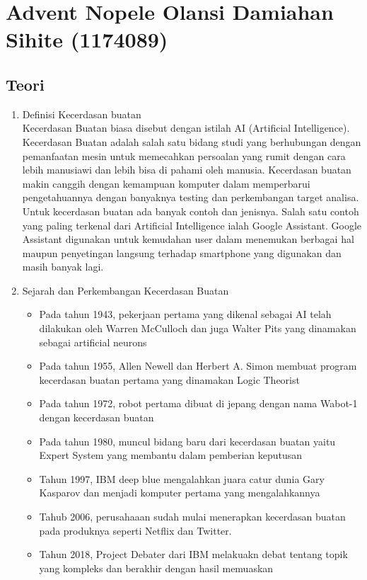 \section{Advent Nopele Olansi Damiahan Sihite (1174089)}
\subsection{Teori}
\begin{enumerate}
\item Definisi Kecerdasan buatan\\ 
Kecerdasan Buatan biasa disebut dengan istilah AI (Artificial Intelligence). Kecerdasan Buatan adalah salah satu bidang studi yang berhubungan dengan pemanfaatan mesin untuk memecahkan persoalan yang rumit dengan cara lebih manusiawi dan lebih bisa di pahami oleh manusia. Kecerdasan buatan makin canggih dengan kemampuan komputer dalam memperbarui pengetahuannya dengan banyaknya testing dan perkembangan target analisa. Untuk kecerdasan buatan ada banyak contoh dan jenisnya. Salah satu contoh yang paling terkenal dari Artificial Intelligence ialah Google Assistant. Google Assistant digunakan untuk kemudahan user dalam menemukan berbagai hal maupun penyetingan langsung terhadap smartphone yang digunakan dan masih banyak lagi.

\item Sejarah dan Perkembangan Kecerdasan Buatan
\begin{itemize}
\item Pada tahun 1943, pekerjaan pertama yang dikenal sebagai AI telah dilakukan oleh Warren McCulloch dan juga Walter Pits yang dinamakan sebagai artificial neurons
\item Pada tahun 1955, Allen Newell dan Herbert A. Simon membuat program kecerdasan buatan pertama yang dinamakan Logic Theorist
\item Pada tahun 1972, robot pertama dibuat di jepang dengan nama Wabot-1 dengan kecerdasan buatan
\item Pada tahun 1980, muncul bidang baru dari kecerdasan buatan yaitu Expert System yang membantu dalam pemberian keputusan
\item Tahun 1997, IBM deep blue mengalahkan juara catur dunia Gary Kasparov dan menjadi komputer pertama yang mengalahkannya
\item Tahub 2006, perusahaaan sudah mulai menerapkan kecerdasan buatan pada produknya seperti Netflix dan Twitter.
\item Tahun 2018,  	Project Debater dari IBM melakuakn debat tentang topik yang kompleks dan berakhir dengan hasil memuaskan
\end{itemize}


\end{enumerate}

